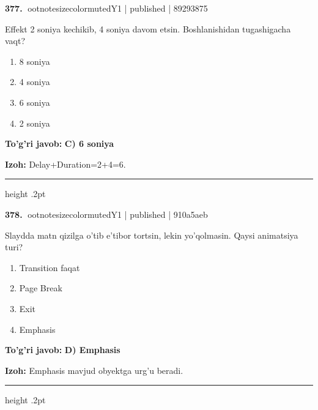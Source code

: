 \documentclass[10pt,a4paper]{article}
\begin{document}
\textbf{\color{ink}377.} {ootnotesizecolor{muted}Y1 | published | 89293875}
\par
Effekt 2 soniya kechikib, 4 soniya davom etsin. Boshlanishidan tugashigacha vaqt?
\begin{enumerate}[label=\Alph*),leftmargin=9mm]
\item 8 soniya
\item 4 soniya
\item 6 soniya
\item 2 soniya
\end{enumerate}
\begin{tcolorbox}[enhanced,breakable,colback=teal!4,colframe=teal!55!black,boxrule=0.45pt,arc=1.2mm,left=2.8mm,right=2.8mm,top=2mm,bottom=2mm]
\textbf{\color{teal}To'g'ri javob:} \textbf{C) 6 soniya}
\par\smallskip
\textbf{Izoh:} Delay+Duration=2+4=6.
\end{tcolorbox}
\vspace{2mm}\hrule height .2pt\vspace{2mm}

\textbf{\color{ink}378.} {ootnotesizecolor{muted}Y1 | published | 910a5aeb}
\par
Slaydda matn qizilga o'tib e'tibor tortsin, lekin yo'qolmasin. Qaysi animatsiya turi?
\begin{enumerate}[label=\Alph*),leftmargin=9mm]
\item Transition faqat
\item Page Break
\item Exit
\item Emphasis
\end{enumerate}
\begin{tcolorbox}[enhanced,breakable,colback=teal!4,colframe=teal!55!black,boxrule=0.45pt,arc=1.2mm,left=2.8mm,right=2.8mm,top=2mm,bottom=2mm]
\textbf{\color{teal}To'g'ri javob:} \textbf{D) Emphasis}
\par\smallskip
\textbf{Izoh:} Emphasis mavjud obyektga urg'u beradi.
\end{tcolorbox}
\vspace{2mm}\hrule height .2pt\vspace{2mm}
\end{document}
